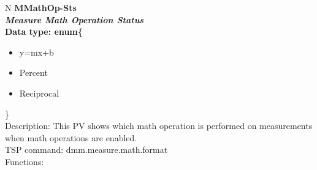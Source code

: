 \documentclass[openany]{article}
\begin{document}
		\begin{tabular}{N}
			\hline
			\bfseries MMathOp-Sts\label{pv:mmathop-sts} \\ \hline
			\emph{Measure Math Operation Status} \\
			Data type: enum\{\begin{itemize}[noitemsep]
				\small
				\item[] y=mx+b
				\item[] Percent
				\item[] Reciprocal
			\end{itemize}\} \\
			Description: This PV shows which math operation is performed on measurements when math operations are enabled. \\
			TSP command: dmm.measure.math.format \\
			Functions: \\
			\arrayrulecolor{\FuncTableBorderColor}

		\end{tabular}
\end{document}

